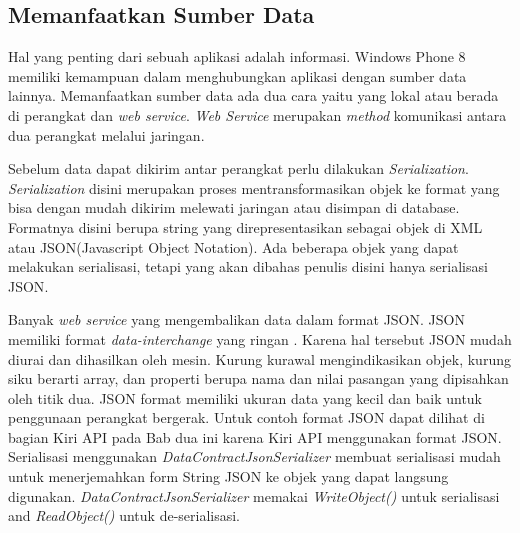 \subsection{Memanfaatkan Sumber Data}
\label{subsec:Memanfaatkan Sumber Data}
\hspace{0.5cm} Hal yang penting dari sebuah aplikasi adalah informasi. Windows Phone 8 memiliki kemampuan dalam menghubungkan aplikasi dengan sumber data lainnya. Memanfaatkan sumber data ada dua cara yaitu yang lokal atau berada di perangkat dan \textit{web service}. \textit{Web Service} merupakan \textit{method} komunikasi antara dua perangkat melalui jaringan. 

Sebelum data dapat dikirim antar perangkat perlu dilakukan \textit{Serialization}. \textit{Serialization} disini merupakan proses mentransformasikan objek ke format yang bisa dengan mudah dikirim melewati jaringan atau disimpan di database. Formatnya disini berupa string yang direpresentasikan sebagai objek di XML atau JSON(Javascript Object Notation). Ada beberapa objek yang dapat melakukan serialisasi, tetapi yang akan dibahas penulis disini hanya serialisasi JSON\cite{Manning}. 

Banyak \textit{web service} yang mengembalikan data dalam format JSON. JSON memiliki format \textit{data-interchange} yang ringan \cite{rfc7159}. Karena hal tersebut JSON mudah diurai dan dihasilkan oleh mesin. Kurung kurawal mengindikasikan objek, kurung siku berarti array, dan properti berupa nama dan nilai pasangan yang dipisahkan oleh titik dua. JSON format memiliki ukuran data yang kecil dan baik untuk penggunaan perangkat bergerak. Untuk contoh format JSON dapat dilihat di bagian Kiri API pada Bab dua ini karena Kiri API menggunakan format JSON. Serialisasi menggunakan \textit{DataContractJsonSerializer} membuat serialisasi mudah untuk menerjemahkan form String JSON ke objek yang dapat langsung digunakan. \textit{DataContractJsonSerializer} memakai \textit{WriteObject()} untuk serialisasi and \textit{ReadObject()} untuk de-serialisasi.

